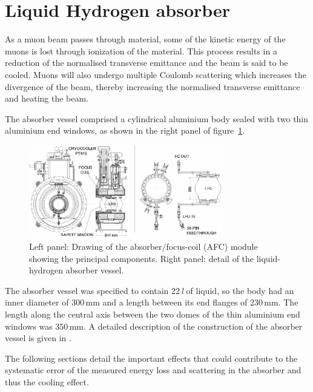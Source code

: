 
\graphicspath{{11-Absorber/Figures/}}

\section{Liquid Hydrogen absorber}
\label{Sect:Absorber}
As a muon beam passes through material, some of the kinetic energy
of the muons is lost through ionization of the material.
This process results in a reduction of the normalised
transverse emittance and the beam is said to be cooled.
Muons will also undergo multiple Coulomb scattering which
increases the divergence of the beam, thereby
increasing the normalised transverse emittance and heating the beam.

The absorber vessel comprised a cylindrical aluminium body sealed with
two thin aluminium end windows, as shown in the right panel of
figure~\ref{Fig:AbsorberVessel:Diag}.
\begin{figure}[htb!]
  \begin{center}
    \includegraphics[width=0.75\textwidth]{11-Absorber/Figures/AFC-drwng.pdf}
  \end{center}
  \caption{
    Left panel: Drawing of the absorber/focus-coil (AFC) module showing the principal components. Right panel: detail of the liquid-hydrogen absorber vessel.
  }
  \label{Fig:AbsorberVessel:Diag}
\end{figure}
The absorber vessel was specified to contain 22\,\textit{l} of liquid, so
the body had an inner diameter of 300\,mm and a length between its end
flanges of 230\,mm.  
The length along the central axis between the two domes of the thin aluminium end
windows was 350\,mm.
A detailed description of the construction of the absorber vessel is given in \cite{1748-0221-13-09-T09008}.

The following sections detail the important effects that could contribute to the systematic error of the measured energy loss and scattering in the absorber and thus the cooling effect.


